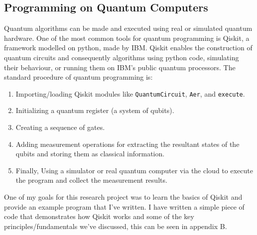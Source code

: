 \subsection{Programming on Quantum Computers}

Quantum algorithms can be made and executed using real or simulated quantum hardware. One of the most common tools for quantum programming is Qiskit, a framework modelled on python, made by IBM. Qiskit enables the construction of quantum circuits and consequently algorithms using python code, simulating their behaviour, or running them on IBM’s public quantum processors. The standard procedure of quantum programming is:
\begin{enumerate}
    \item Importing/loading Qiskit modules like \texttt{QuantumCircuit}, \texttt{Aer}, and \texttt{execute}.
    \item Initializing a quantum register (a system of qubits).
    \item Creating a sequence of gates.
    \item Adding measurement operations for extracting the resultant states of the qubits and storing them as classical information.
    \item Finally, Using a simulator or real quantum computer via the cloud to execute the program and collect the measurement results.
\end{enumerate}

\noindent One of my goals for this research project was to learn the basics of Qiskit and provide an example program that I've written. I have written a simple piece of code that demonstrates how Qiskit works and some of the key principles/fundamentals we've discussed, this can be seen in appendix B.


